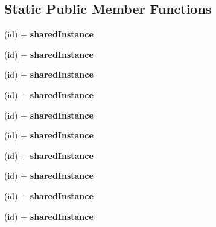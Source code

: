\subsection*{\-Static \-Public \-Member \-Functions}
\begin{DoxyCompactItemize}
\item 
\hypertarget{interface_s_b_json_stream_parser_state_ad17b227a54da2a32a63e5d1f586f0109}{
(id) + {\bfseries shared\-Instance}}
\label{interface_s_b_json_stream_parser_state_ad17b227a54da2a32a63e5d1f586f0109}

\item 
\hypertarget{interface_s_b_json_stream_parser_state_ad17b227a54da2a32a63e5d1f586f0109}{
(id) + {\bfseries shared\-Instance}}
\label{interface_s_b_json_stream_parser_state_ad17b227a54da2a32a63e5d1f586f0109}

\item 
\hypertarget{interface_s_b_json_stream_parser_state_ad17b227a54da2a32a63e5d1f586f0109}{
(id) + {\bfseries shared\-Instance}}
\label{interface_s_b_json_stream_parser_state_ad17b227a54da2a32a63e5d1f586f0109}

\item 
\hypertarget{interface_s_b_json_stream_parser_state_ad17b227a54da2a32a63e5d1f586f0109}{
(id) + {\bfseries shared\-Instance}}
\label{interface_s_b_json_stream_parser_state_ad17b227a54da2a32a63e5d1f586f0109}

\item 
\hypertarget{interface_s_b_json_stream_parser_state_ad17b227a54da2a32a63e5d1f586f0109}{
(id) + {\bfseries shared\-Instance}}
\label{interface_s_b_json_stream_parser_state_ad17b227a54da2a32a63e5d1f586f0109}

\item 
\hypertarget{interface_s_b_json_stream_parser_state_ad17b227a54da2a32a63e5d1f586f0109}{
(id) + {\bfseries shared\-Instance}}
\label{interface_s_b_json_stream_parser_state_ad17b227a54da2a32a63e5d1f586f0109}

\item 
\hypertarget{interface_s_b_json_stream_parser_state_ad17b227a54da2a32a63e5d1f586f0109}{
(id) + {\bfseries shared\-Instance}}
\label{interface_s_b_json_stream_parser_state_ad17b227a54da2a32a63e5d1f586f0109}

\item 
\hypertarget{interface_s_b_json_stream_parser_state_ad17b227a54da2a32a63e5d1f586f0109}{
(id) + {\bfseries shared\-Instance}}
\label{interface_s_b_json_stream_parser_state_ad17b227a54da2a32a63e5d1f586f0109}

\item 
\hypertarget{interface_s_b_json_stream_parser_state_ad17b227a54da2a32a63e5d1f586f0109}{
(id) + {\bfseries shared\-Instance}}
\label{interface_s_b_json_stream_parser_state_ad17b227a54da2a32a63e5d1f586f0109}

\item 
\hypertarget{interface_s_b_json_stream_parser_state_ad17b227a54da2a32a63e5d1f586f0109}{
(id) + {\bfseries shared\-Instance}}
\label{interface_s_b_json_stream_parser_state_ad17b227a54da2a32a63e5d1f586f0109}

\end{DoxyCompactItemize}


